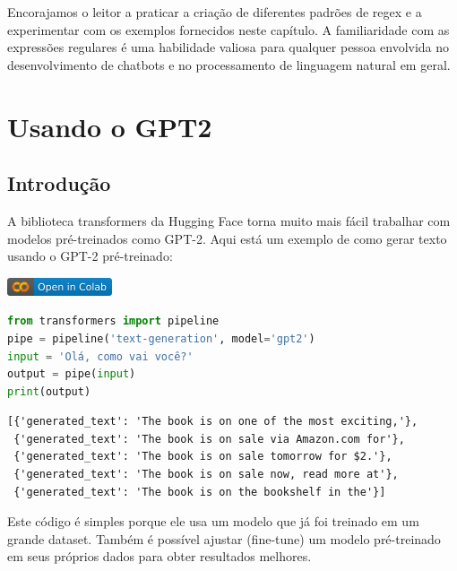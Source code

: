 \documentclass[14pt,a4paper,oneside]{book}
\begin{document}
Encorajamos o leitor a praticar a criação de diferentes padrões de regex e a experimentar com os exemplos fornecidos neste capítulo. A familiaridade com as expressões regulares é uma habilidade valiosa para qualquer pessoa envolvida no desenvolvimento de chatbots e no processamento de linguagem natural em geral.



\chapter{Usando o GPT2}

\section{Introdução}

A biblioteca transformers da Hugging Face torna muito mais fácil trabalhar com modelos pré-treinados como GPT-2. Aqui está um exemplo de como gerar texto usando o GPT-2 pré-treinado:

\vspace{\baselineskip}
\href{https://colab.research.google.com/github/giseldo/chatbotbook_v2/blob/main/notebook/cap12.ipynb}{
  \includegraphics{./fig/colab-badge.png}
}

\begin{lstlisting}[language=Python, caption=Exemplo de uso do GPT-2 com a biblioteca transformers, label=lst:gpt2_exemplo]
from transformers import pipeline
pipe = pipeline('text-generation', model='gpt2')
input = 'Olá, como vai você?'
output = pipe(input)
print(output)
\end{lstlisting}

\begin{lstlisting}
[{'generated_text': 'The book is on one of the most exciting,'},
 {'generated_text': 'The book is on sale via Amazon.com for'}, 
 {'generated_text': 'The book is on sale tomorrow for $2.'}, 
 {'generated_text': 'The book is on sale now, read more at'}, 
 {'generated_text': 'The book is on the bookshelf in the'}]
\end{lstlisting}

Este código é simples porque ele usa um modelo que já foi treinado em um grande dataset. Também é possível ajustar (fine-tune) um modelo pré-treinado em seus próprios dados para obter resultados melhores.
\end{document}
